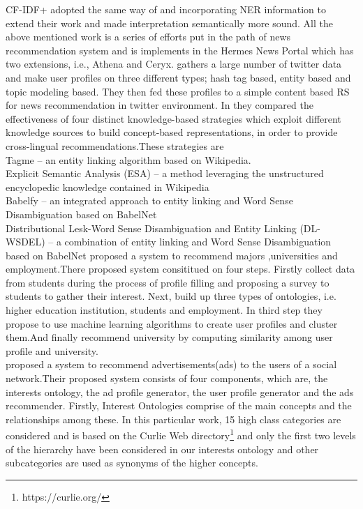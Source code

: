  CF-IDF+ adopted the same way of \cite{bingSF-IDF+} and incorporating NER information to extend their work \cite{Bing-CF-IDF+} and made interpretation semantically more sound.
All the above mentioned work is a series of efforts put in the path of news recommendation system and is implements in the Hermes News Portal which has two extensions, i.e., Athena\cite{Athena} and Ceryx\cite{SF-IDF}.
\newline
\cite{N61} gathers a large number of twitter data and make user profiles on three different types; hash tag based, entity based and topic modeling based. They then fed these profiles to a simple content based RS for news recommendation in twitter environment.
\newline
In \cite{N28}they compared the effectiveness of four distinct knowledge-based strategies which exploit different knowledge sources to build concept-based representations, in order to provide cross-lingual recommendations.These strategies are \\Tagme – an entity linking algorithm based on Wikipedia.
\\Explicit Semantic Analysis (ESA) – a method leveraging the unstructured encyclopedic knowledge contained in Wikipedia
\\Babelfy – an integrated approach to entity linking and Word Sense Disambiguation based on BabelNet 
\\Distributional Lesk-Word Sense Disambiguation and Entity Linking (DL-WSDEL) – a combination of entity linking and Word
Sense Disambiguation based on BabelNet
\newline
\cite{N57}proposed a system to recommend majors ,universities and employment.There proposed system consititued on four steps. Firstly collect data from students during the process of profile filling and proposing a survey to students to gather their interest. Next, build up three types of ontologies, i.e. higher education institution, students and employment. In third step they propose to use machine learning algorithms to create user profiles and cluster them.And finally recommend university by computing similarity among user profile and university.
\\\cite{N9}proposed a system to recommend advertisements(ads) to the users of a social network.Their proposed system consists of four components, which are, the interests ontology, the ad profile generator, the user profile generator and the ads recommender. Firstly, Interest Ontologies comprise of the main concepts and the relationships among these.
In this particular work, 15 high class categories are considered and is based on the Curlie Web directory\footnote{https://curlie.org/} and only the first two levels of the hierarchy have been considered in our interests ontology and other subcategories are used as synonyms of the higher concepts.
